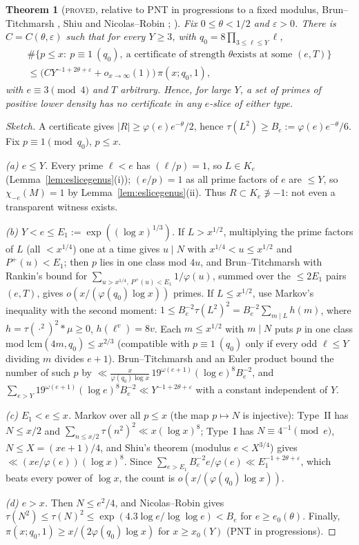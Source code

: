 \documentclass[10pt,reqno]{amsart}
\newtheorem{theorem}{Theorem}[section]
\theoremstyle{definition}
\numberwithin{equation}{section}
\newcommand{\status}[1]{\textup{\textsc{#1}}}
\begin{document}
\begin{theorem}[\status{proved}, relative to PNT in progressions to a fixed modulus, Brun--Titchmarsh \cite{MV}, Shiu {\cite[Thm.~1]{Shiu}} and Nicolas--Robin \cite{NR}; {\cite[Thm.~2.2]{LP}}]\label{thm:transparent}
Fix $0\le\theta<1/2$ and $\varepsilon>0$. There is $C=C(\theta,\varepsilon)$
such that for every $Y\ge3$, with $q_0=8\prod_{3\le\ell\le Y}\ell$,
\begin{multline*}
\#\{p\le x:\ p\equiv1\ (q_0),\ \text{a certificate of strength $\theta$
exists at some }(e,T)\}\\
\le\bigl(CY^{-1+2\theta+\varepsilon}+o_{x\to\infty}(1)\bigr)\,\pi(x;q_0,1),
\end{multline*}
with $e\equiv3\pmod4$ and $T$ arbitrary. Hence, for large $Y$, a set of primes of positive lower density has no
certificate in any $e$-slice of either type.
\end{theorem}
\begin{proof}[Sketch]
A certificate gives $|R|\ge\varphi(e)e^{-\theta}/2$, hence
$\tau(L^2)\ge B_e:=\varphi(e)e^{-\theta}/6$. Fix $p\equiv1\pmod{q_0}$, $p\le x$.

\emph{(a) $e\le Y$.} Every prime $\ell<e$ has $(\ell/p)=1$, so $L\in K_e$
(Lemma~\ref{lem:eslicegenus}(i)); $(e/p)=1$ as all prime factors of $e$ are
$\le Y$, so $\chi_{-e}(M)=1$ by Lemma~\ref{lem:eslicegenus}(ii). Thus
$R\subset K_e\not\ni-1$: not even a transparent witness exists.

\emph{(b) $Y<e\le E_1:=\exp((\log x)^{1/3})$.} If $L>x^{1/2}$, multiplying the
prime factors of $L$ (all $<x^{1/4}$) one at a time gives $u\mid N$ with
$x^{1/4}<u\le x^{1/2}$ and $P^+(u)<E_1$; then $p$ lies in one class mod
$4u$, and Brun--Titchmarsh with Rankin's bound for
$\sum_{u>x^{1/4},\,P^+(u)<E_1}1/\varphi(u)$, summed over the $\le2E_1$ pairs
$(e,T)$, gives $o(x/(\varphi(q_0)\log x))$ primes. If $L\le x^{1/2}$, use
Markov's inequality with the second moment:
$1\le B_e^{-2}\tau(L^2)^2=B_e^{-2}\sum_{m\mid L}h(m)$, where
$h=\tau(\cdot^2)^2*\mu\ge0$, $h(\ell^v)=8v$. Each $m\le x^{1/2}$ with $m\mid N$
puts $p$ in one class mod $\mathrm{lcm}(4m,q_0)\le x^{2/3}$ (compatible with
$p\equiv1\ (q_0)$ only if every odd $\ell\le Y$ dividing $m$ divides $e+1$).
Brun--Titchmarsh and an Euler product bound the number of such $p$ by
$\ll\frac{x}{\varphi(q_0)\log x}\,19^{\omega(e+1)}(\log e)^8B_e^{-2}$, and
$\sum_{e>Y}19^{\omega(e+1)}(\log e)^8B_e^{-2}\ll Y^{-1+2\theta+\varepsilon}$ with
a constant independent of $Y$.

\emph{(c) $E_1<e\le x$.} Markov over all $p\le x$ (the map $p\mapsto N$ is
injective): Type~II has $N\le x/2$ and $\sum_{n\le x/2}\tau(n^2)^2\ll x(\log x)^8$;
Type~I has $N\equiv4^{-1}\pmod e$, $N\le X=(xe+1)/4$, and Shiu's theorem
(modulus $e<X^{3/4}$) gives $\ll(xe/\varphi(e))(\log x)^8$. Since
$\sum_{e>E_1}B_e^{-2}e/\varphi(e)\ll E_1^{-1+2\theta+\varepsilon}$, which beats every
power of $\log x$, the count is $o(x/(\varphi(q_0)\log x))$.

\emph{(d) $e>x$.} Then $N\le e^2/4$, and Nicolas--Robin gives
$\tau(N^2)\le\tau(N)^2\le\exp(4.3\log e/\log\log e)<B_e$ for $e\ge e_0(\theta)$.
Finally, $\pi(x;q_0,1)\ge x/(2\varphi(q_0)\log x)$ for $x\ge x_0(Y)$ (PNT in
progressions).
\end{proof}
\end{document}
